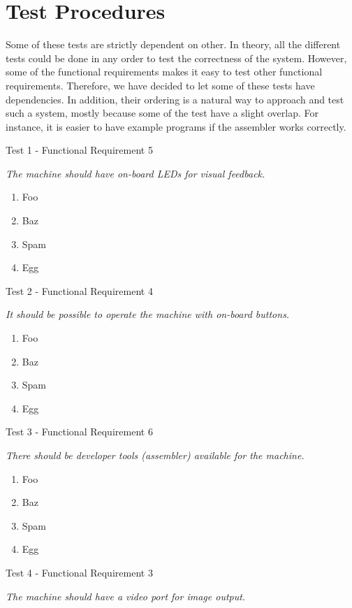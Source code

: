 \section{Test Procedures}

Some of these tests are strictly dependent on other. In theory, all the
different tests could be done in any order to test the correctness of the
system. However, some of the functional requirements makes it easy to test other
functional requirements. Therefore, we have decided to let some of these tests
have dependencies. In addition, their ordering is a natural way to approach and
test such a system, mostly because some of the test have a slight overlap. For
instance, it is easier to have example programs if the assembler works
correctly.

{\sc Test 1 - Functional Requirement 5}

{\em The machine should have on-board LEDs for visual feedback.}

\begin{enumerate}
\item Foo
\item Baz
\item Spam
\item Egg
\end{enumerate}

{\sc Test 2 - Functional Requirement 4}

{\em It should be possible to operate the machine with on-board buttons.}

\begin{enumerate}
\item Foo
\item Baz
\item Spam
\item Egg
\end{enumerate}

{\sc Test 3 - Functional Requirement 6}

{\em There should be developer tools (assembler) available for the machine.}

\begin{enumerate}
\item Foo
\item Baz
\item Spam
\item Egg
\end{enumerate}

{\sc Test 4 - Functional Requirement 3}

{\em The machine should have a video port for image output.}

